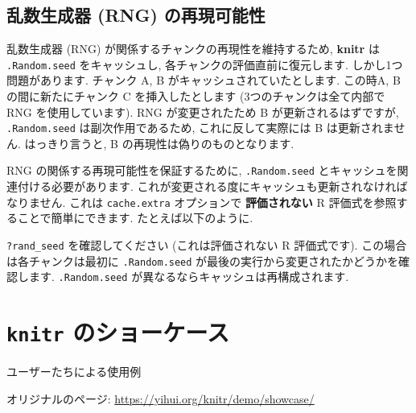 \documentclass[
]{bxjsreport}
\newenvironment{Shaded}{\begin{snugshade}}{\end{snugshade}}
\newcommand{\AttributeTok}[1]{\textcolor[rgb]{0.77,0.63,0.00}{#1}}
\newcommand{\FunctionTok}[1]{\textcolor[rgb]{0.00,0.00,0.00}{#1}}
\newcommand{\NormalTok}[1]{#1}
\newcommand{\SpecialCharTok}[1]{\textcolor[rgb]{0.00,0.00,0.00}{#1}}
\begin{document}
\hypertarget{ux4e71ux6570ux751fux6210ux5668-rng-ux306eux518dux73feux53efux80fdux6027}{%
\section*{乱数生成器 (RNG)
の再現可能性}\label{ux4e71ux6570ux751fux6210ux5668-rng-ux306eux518dux73feux53efux80fdux6027}}

乱数生成器 (RNG) が関係するチャンクの再現性を維持するため,
\textbf{knitr} は \texttt{.Random.seed} をキャッシュし,
各チャンクの評価直前に復元します. しかし1つ問題があります. チャンク A, B
がキャッシュされていたとします. この時A, B の間に新たにチャンク C
を挿入したとします (3つのチャンクは全て内部で RNG を使用しています). RNG
が変更されたため B が更新されるはずですが, \texttt{.Random.seed}
は副次作用であるため, これに反して実際には B は更新されません.
はっきり言うと, B の再現性は偽りのものとなります.

RNG の関係する再現可能性を保証するために, \texttt{.Random.seed}
とキャッシュを関連付ける必要があります.
これが変更される度にキャッシュも更新されなければなりません. これは
\texttt{cache.extra} オプションで \textbf{評価されない} R
評価式を参照することで簡単にできます. たとえば以下のように.

\begin{Shaded}
\end{Shaded}

\texttt{?rand\_seed} を確認してください (これは評価されない R
評価式です). この場合は各チャンクは最初に \texttt{.Random.seed}
が最後の実行から変更されたかどうかを確認します. \texttt{.Random.seed}
が異なるならキャッシュは再構成されます.

\hypertarget{showcase}{%
\chapter*{\texorpdfstring{\texttt{knitr}
のショーケース}{knitr のショーケース}}\label{showcase}}

ユーザーたちによる使用例

オリジナルのページ: \url{https://yihui.org/knitr/demo/showcase/}
\end{document}
